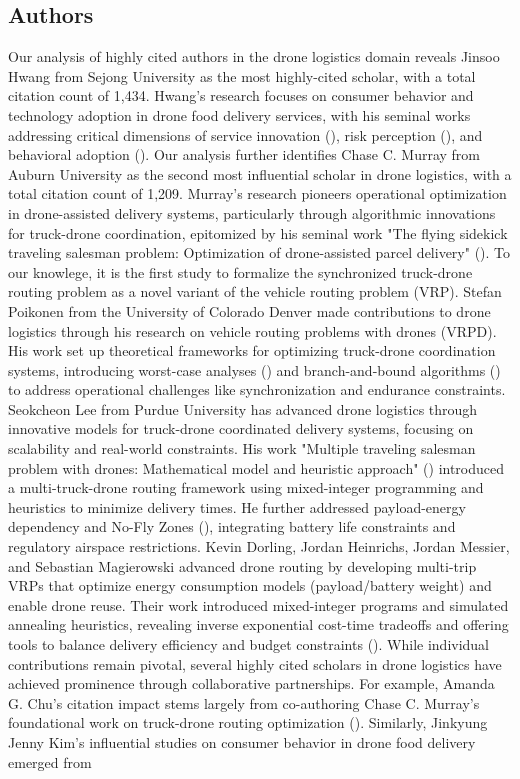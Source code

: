 \documentclass{article}
\begin{document}
\subsection{Authors}
Our analysis of highly cited authors in the drone logistics domain reveals Jinsoo Hwang from Sejong University as the most highly-cited scholar, with a total citation count of 1,434. Hwang’s research focuses on consumer behavior and technology adoption in drone food delivery services, with his seminal works addressing critical dimensions of service innovation (\cite{WOS:000478712400012}), risk perception (\cite{WOS:000495004400013}), and behavioral adoption (\cite{WOS:000605628800016}). Our analysis further identifies Chase C. Murray from Auburn University as the second most influential scholar in drone logistics, with a total citation count of 1,209. Murray’s research pioneers operational optimization in drone-assisted delivery systems, particularly through algorithmic innovations for truck-drone coordination, epitomized by his seminal work "The flying sidekick traveling salesman problem: Optimization of drone-assisted parcel delivery" (\cite{WOS:000353871700006}). To our knowlege, it is the first study to formalize the synchronized truck-drone routing problem as a novel variant of the vehicle routing problem (VRP). Stefan Poikonen from the University of Colorado Denver made contributions to drone logistics through his research on vehicle routing problems with drones (VRPD). His work set up theoretical frameworks for optimizing truck-drone coordination systems, introducing worst-case analyses (\cite{WOS:000400384200003}) and branch-and-bound algorithms (\cite{WOS:000468604000010}) to address operational challenges like synchronization and endurance constraints. Seokcheon Lee from Purdue University has advanced drone logistics through innovative models for truck-drone coordinated delivery systems, focusing on scalability and real-world constraints. His work "Multiple traveling salesman problem with drones: Mathematical model and heuristic approach" (\cite{WOS:000460496000002}) introduced a multi-truck-drone routing framework using mixed-integer programming and heuristics to minimize delivery times. He further addressed payload-energy dependency and No-Fly Zones (\cite{WOS:000474324300017}), integrating battery life constraints and regulatory airspace restrictions. Kevin Dorling, Jordan Heinrichs, Jordan Messier, and Sebastian Magierowski advanced drone routing by developing multi-trip VRPs that optimize energy consumption models (payload/battery weight) and enable drone reuse. Their work introduced mixed-integer programs and simulated annealing heuristics, revealing inverse exponential cost-time tradeoffs and offering tools to balance delivery efficiency and budget constraints (\cite{WOS:000391480400007}). While individual contributions remain pivotal, several highly cited scholars in drone logistics have achieved prominence through collaborative partnerships. For example, Amanda G. Chu's citation impact stems largely from co-authoring Chase C. Murray's foundational work on truck-drone routing optimization  (\cite{WOS:000353871700006}). Similarly, Jinkyung Jenny Kim’s influential studies on consumer behavior in drone food delivery emerged from 
\end{document}
